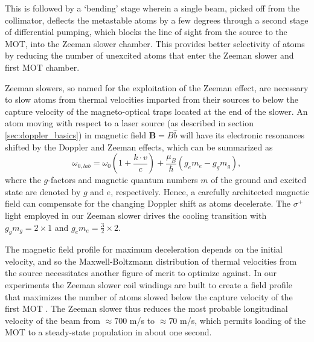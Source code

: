 	This is followed by a `bending' stage wherein a single beam, picked off from the collimator, deflects the metastable atoms by a few degrees through a second stage of differential pumping, which blocks the line of sight from the source to the MOT, into the Zeeman slower chamber.
	This provides better selectivity of \mhe atoms by reducing the number of unexcited atoms that enter the Zeeman slower and first MOT chamber.

	Zeeman slowers, so named for the exploitation of the Zeeman effect, are necessary to slow atoms from thermal velocities imparted from their sources to below the capture velocity of the magneto-optical traps located at the end of the slower.
	An atom moving with respect to a laser source (as described in section \ref{sec:doppler_basics}) in magnetic field $\textbf{B} = B\hat{b}$ will have its electronic resonances shifted by the Doppler and Zeeman effects, which can be summarized as
	\begin{equation}
		\omega_{0,lab} = \omega_{0}\left(1 + \frac{k\cdot v}{c}\right) + \frac{\mu_B }{\hbar}\left(g_e m_e - g_g m_g\right),
	\end{equation}
	where the $g$-factors and magnetic quantum numbers $m$ of the ground and excited state are denoted by $g$ and $e$, respectively. 
	Hence, a carefully architected magnetic field can compensate for the changing Doppler shift as atoms decelerate.
	The $\sigma^+$ light employed in our Zeeman slower drives the cooling transition with $g_g m_g = 2\times 1$ and $g_e m_e = \frac{3}{2}\times2$.
	
	The magnetic field profile for maximum deceleration depends on the initial velocity, and so the Maxwell-Boltzmann distribution of thermal velocities from the source necessitates another figure of merit to optimize against.
	In our experiments the Zeeman slower coil windings are built to create a field profile that maximizes the number of atoms slowed below the capture velocity of the first MOT \cite{Dedman04}.
	The Zeeman slower thus reduces the most probable longitudinal velocity of the beam from $\approx700$ m/s to $\approx70$ m/s, which permits loading of the MOT to a steady-state population in about one second.

